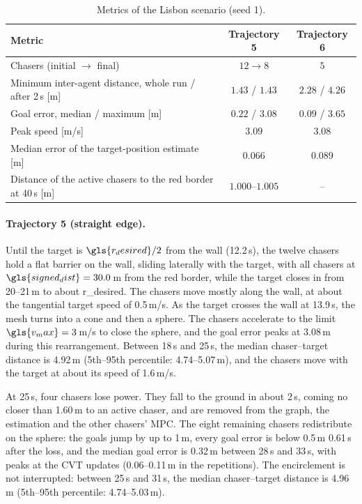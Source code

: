 \begin{table}[htbp]
    \centering
    \caption{Metrics of the Lisbon scenario (seed 1).}
    \label{tab.6:lisbon_metrics}
    \begin{tabular}{p{} c c}
    \hline
    \textbf{Metric} & \textbf{Trajectory 5} & \textbf{Trajectory 6} \\
    \hline
    Chasers (initial $\rightarrow$ final) & $12\rightarrow8$ & $5$ \\
    Minimum inter-agent distance, whole run / after 2\,s [m] & $1.43$ / $1.43$ & $2.28$ / $4.26$ \\
    Goal error, median / maximum [m] & $0.22$ / $3.08$ & $0.09$ / $3.65$ \\
    Peak speed [m/s] & $3.09$ & $3.08$ \\
    Median error of the target-position estimate [m] & $0.066$ & $0.089$ \\
    Distance of the active chasers to the red border at 40\,s [m] & $1.000$--$1.005$ & -- \\
    \hline
    \end{tabular}
\end{table}

\paragraph{Trajectory 5 (straight edge).}
Until the target is $\gls{r_desired}/2$ from the wall (12.2\,s), the twelve chasers hold a flat barrier on the wall, sliding laterally with the target, with all chasers at $\gls{signed_dist}=30.0$\,m from the red border, while the target closes in from 20--21\,m to about \gls{r_desired}. The chasers move mostly along the wall, at about the tangential target speed of 0.5\,m/s. As the target crosses the wall at 13.9\,s, the mesh turns into a cone and then a sphere. The chasers accelerate to the limit $\gls{v_max}=3$\,m/s to close the sphere, and the goal error peaks at 3.08\,m during this rearrangement. Between 18\,s and 25\,s, the median chaser--target distance is 4.92\,m (5th--95th percentile: 4.74--5.07\,m), and the chasers move with the target at about its speed of 1.6\,m/s.

At 25\,s, four chasers lose power. They fall to the ground in about 2\,s, coming no closer than 1.60\,m to an active chaser, and are removed from the graph, the estimation and the other chasers' \gls{MPC}. The eight remaining chasers redistribute on the sphere: the goals jump by up to 1\,m, every goal error is below 0.5\,m 0.61\,s after the loss, and the median goal error is 0.32\,m between 28\,s and 33\,s, with peaks at the \gls{CVT} updates (0.06--0.11\,m in the repetitions). The encirclement is not interrupted: between 25\,s and 31\,s, the median chaser--target distance is 4.96\,m (5th--95th percentile: 4.74--5.03\,m).

